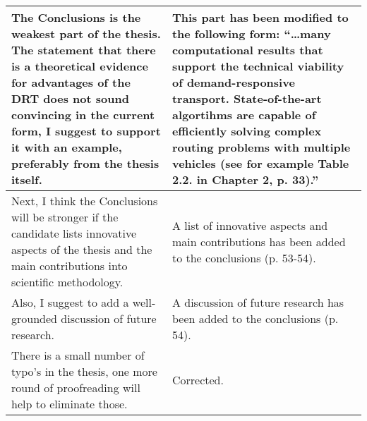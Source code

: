 \documentclass[a4paper,12pt]{article}
\begin{document}
\begin{longtable}{|p{}|p{}|}
\\ \hline
The Conclusions is the weakest part of the thesis. The statement that there is a theoretical
evidence for advantages of the DRT does not sound convincing in the current form, I suggest to
support it with an example, preferably from the thesis itself. 
& 
This part has been modified to the following form: ``\ldots many computational results
that support the technical viability of demand-responsive transport. State-of-the-art 
algortihms are capable of efficiently solving complex routing problems with multiple vehicles (see for example Table 2.2. in Chapter 2, p. 33).''
\\ \hline
Next, I think the Conclusions will
be stronger if the candidate lists innovative aspects of the thesis and the main contributions into
scientific methodology. 
& 
A list of innovative aspects and main contributions has been added to the conclusions (p. 53-54).
\\ \hline
Also, I suggest to add a well-grounded discussion of future research.
& 
A discussion of future research has been added to the conclusions (p. 54).
\\ \hline
There is a small number of typo’s in the thesis, one more round of proofreading will help to
eliminate those.
& 
Corrected.
\\ \hline
\end{longtable}
\end{document}
